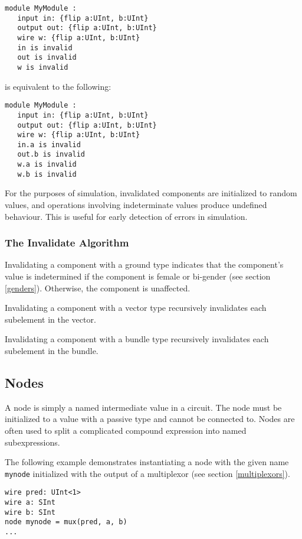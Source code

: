 \documentclass[12pt]{article}
\begin{document}
\begin{lstlisting}
module MyModule :
   input in: {flip a:UInt, b:UInt}
   output out: {flip a:UInt, b:UInt}
   wire w: {flip a:UInt, b:UInt}
   in is invalid
   out is invalid
   w is invalid
\end{lstlisting}
is equivalent to the following:
\begin{lstlisting}
module MyModule :
   input in: {flip a:UInt, b:UInt}
   output out: {flip a:UInt, b:UInt}
   wire w: {flip a:UInt, b:UInt}
   in.a is invalid
   out.b is invalid
   w.a is invalid
   w.b is invalid
\end{lstlisting}

For the purposes of simulation, invalidated components are initialized to random values, and operations involving indeterminate values produce undefined behaviour. This is useful for early detection of errors in simulation.

\subsubsection{The Invalidate Algorithm}\label{invalidate_algorithm}
Invalidating a component with a ground type indicates that the component's value is indetermined if the component is female or bi-gender (see section \ref{genders}). Otherwise, the component is unaffected.

Invalidating a component with a vector type recursively invalidates each subelement in the vector.

Invalidating a component with a bundle type recursively invalidates each subelement in the bundle.

\subsection{Nodes}
A node is simply a named intermediate value in a circuit. The node must be initialized to a value with a passive type and cannot be connected to. Nodes are often used to split a complicated compound expression into named subexpressions.

The following example demonstrates instantiating a node with the given name \verb|mynode| initialized with the output of a multiplexor (see section \ref{multiplexors}).

\begin{lstlisting}
wire pred: UInt<1>
wire a: SInt
wire b: SInt
node mynode = mux(pred, a, b)
...
\end{lstlisting}
\end{document}
